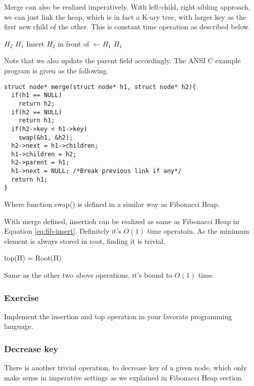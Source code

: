\documentclass{article}
\begin{document}
Merge can also be realized imperatively. With left-child, right
sibling approach, we can just link the heap, which is in fact a
K-ary tree, with larger key as the first new child of the other.
This is constant time operation as described below.

\begin{algorithmic}
    \State \Return $H_2$
  \EndIf
    \State \Return $H_1$
  \EndIf
    \State {}
  \EndIf
  \State Insert $H_2$ in front of 
  \State {} $\gets H_1$
  \State \Return $H_1$
\EndFunction
\end{algorithmic}

Note that we also update the parent field accordingly. The ANSI C
example program is given as the following.

\lstset{language=C}
\begin{lstlisting}
struct node* merge(struct node* h1, struct node* h2){
  if(h1 == NULL)
    return h2;
  if(h2 == NULL)
    return h1;
  if(h2->key < h1->key)
    swap(&h1, &h2);
  h2->next = h1->children;
  h1->children = h2;
  h2->parent = h1;
  h1->next = NULL; /*Break previous link if any*/
  return h1;
}
\end{lstlisting}

Where function swap() is defined in a similar way as Fibonacci Heap.

With merge defined, insertioh can be realized as same as Fibonacci Heap 
in Equation \ref{eq:fib-insert}. Definitely it's $O(1)$ time operatoin.
As the minimum element is always stored in root, finding it is trivial.

\be
top(H) = Root(H)
\ee

Same as the other two above operations, it's bound to $O(1)$ time.

\subsubsection*{Exercise}
Implement the insertion and top operation in your favorate programming
language.

\subsubsection{Decrease key}
There is another trivial operation, to decrease key of a given node,
which only make sense in imperative settings as we explained in Fibonacci
Heap section.
\end{document}
